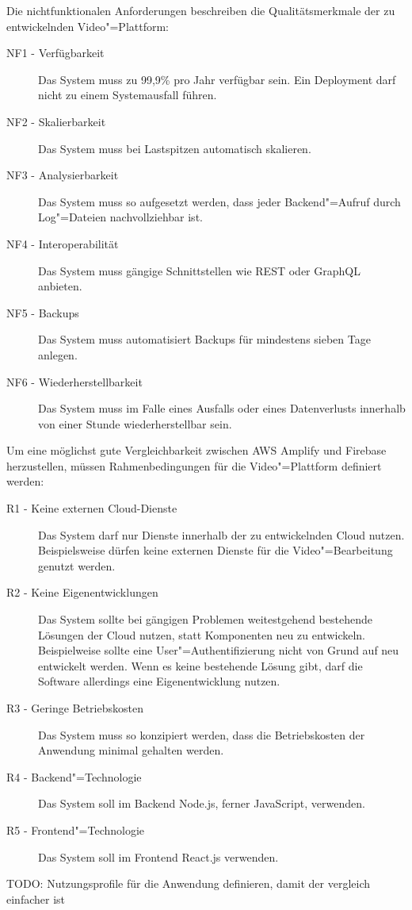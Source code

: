 Die nichtfunktionalen Anforderungen beschreiben die Qualitätsmerkmale der zu entwickelnden Video"=Plattform:
\begin{description}
   \item[NF1 - Verfügbarkeit] Das System muss zu 99,9\% pro Jahr verfügbar sein. Ein Deployment darf nicht zu einem Systemausfall führen.\label{NF1}
   \item[NF2 - Skalierbarkeit] Das System muss bei Lastspitzen automatisch skalieren.\label{NF2}
   \item[NF3 - Analysierbarkeit] Das System muss so aufgesetzt werden, dass jeder Backend"=Aufruf durch Log"=Dateien nachvollziehbar ist.\label{NF3}
   \item[NF4 - Interoperabilität] Das System muss gängige Schnittstellen wie REST oder GraphQL anbieten.\label{NF4}
   \item[NF5 - Backups] Das System muss automatisiert Backups für mindestens sieben Tage anlegen.\label{NF6}
   \item[NF6 - Wiederherstellbarkeit] Das System muss im Falle eines Ausfalls oder eines Datenverlusts innerhalb von einer Stunde wiederherstellbar sein.\label{NF7}
\end{description}

Um eine möglichst gute Vergleichbarkeit zwischen \ac{AWS} Amplify und Firebase herzustellen, müssen Rahmenbedingungen für die Video"=Plattform definiert werden:
\begin{description}
   \item[R1 - Keine externen Cloud-Dienste] Das System darf nur Dienste innerhalb der zu entwickelnden Cloud nutzen. Beispielsweise dürfen keine externen Dienste für die Video"=Bearbeitung genutzt werden.
   \item[R2 - Keine Eigenentwicklungen] Das System sollte bei gängigen Problemen weitestgehend bestehende Lösungen der Cloud nutzen, statt Komponenten neu zu entwickeln. Beispielweise sollte eine User"=Authentifizierung nicht von Grund auf neu entwickelt werden. Wenn es keine bestehende Lösung gibt, darf die Software allerdings eine Eigenentwicklung nutzen.
   \item[R3 - Geringe Betriebskosten] Das System muss so konzipiert werden, dass die Betriebskosten der Anwendung minimal gehalten werden.
   \item[R4 - Backend"=Technologie] Das System soll im Backend Node.js, ferner JavaScript, verwenden.
   \item[R5 - Frontend"=Technologie] Das System soll im Frontend React.js verwenden.
\end{description}


TODO: Nutzungsprofile für die Anwendung definieren, damit der vergleich einfacher ist